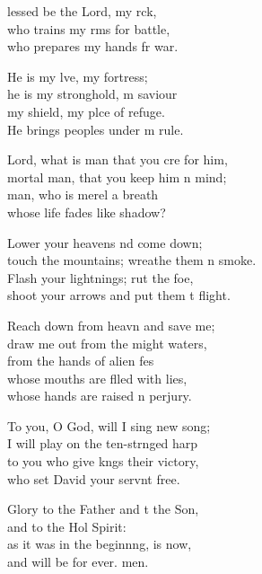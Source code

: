 \settowidth{\versewidth}{touch the mountains; wreathe them in smoke.}
\begin{psalmverse}%
  \begin{patverse}
lessed be the Lord, my rck,\Flex\\
who trains my rms for battle,\Med\\
who prepares my hands fr war.

He is my lve, my fortress;\Med\\
he is my stronghold, m saviour\\
my shield, my plce of refuge.\Med\\
He brings peoples under m rule.

Lord, what is man that you cre for him,\Med\\
mortal man, that you keep him \pointup{\i}n mind;\\
man, who is merel a breath\Med\\
whose life fades like  shadow?

Lower your heavens nd come down;\Med\\
touch the mountains; wreathe them \pointup{\i}n smoke.\\
Flash your lightnings; rut the foe,\Med\\
shoot your arrows and put them t flight.

Reach down from heavn and save me;\Med\\
draw me out from the might waters,\\
from the hands of alien fes\Flex\\
whose mouths are f\pointup{\i}lled with lies,\Med\\
whose hands are raised \pointup{\i}n perjury.

To you, O God, will I sing  new song;\Med\\
I will play on the ten-str\pointup{\i}nged harp\\
to you who give k\pointup{\i}ngs their victory,\Med\\
who set David your servnt free.

Glory to the Father and t the Son,\Med\\
and to the Hol Spirit:\\
as it was in the beginn\pointup{\i}ng, is now,\Med\\
and will be for ever. men.
  \end{patverse}
\end{psalmverse}
\setlength{\leftmargini}{\defleftmargini}  %
